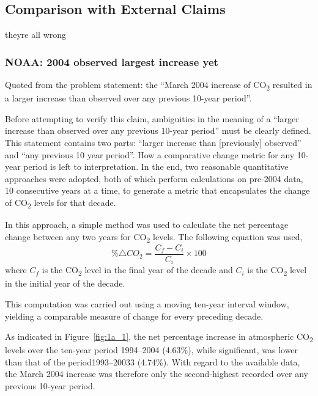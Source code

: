 \documentclass[12pt]{mcmthesis}
\newcommand{\size}[2]{{\fontsize{#1}{0}\selectfont#2}}
\begin{document}
    \subsection{Comparison with External Claims}
    they\textquotesingle re all wrong


    \subsubsection*{NOAA: 2004 observed largest increase yet}

    Quoted from the problem statement: the ``March 2004 increase of CO\textsubscript{2} resulted in a larger increase than observed over any previous 10-year period''.

    Before attempting to verify this claim, ambiguities in the meaning of a ``larger increase than observed over any previous 10-year period'' must be clearly defined.
    This statement contains two parts: ``larger increase than [previously] observed'' and ``any previous 10 year period''.
    How a comparative change metric for any 10-year period is left to interpretation.
    In the end, two reasonable quantitative approaches were adopted, both of which perform calculations on pre-2004 data, 10 consecutive years at a time, to generate a metric that encapsulates the change of CO\textsubscript{2} levels for that decade.


    \noindent\size{12}{\textbf{Comparing to decadal changes}}

    In this approach, a simple method was used to calculate the net percentage change between any two years for CO\textsubscript{2} levels. The following equation was used,
%
    \begin{equation}
        \displaystyle \% \triangle CO_2 = \frac{C_f - C_i}{C_i} \times 100
    \end{equation}
%
    where
    $C_f$ is the CO\textsubscript{2} level in the final year of the decade and
    $C_i$ is the CO\textsubscript{2} level in the initial year of the decade.

    This computation was carried out using a moving ten-year interval window, yielding a comparable measure of change for every preceding decade.

    As indicated in Figure~\ref{fig:1a_1}, the net percentage increase in atmospheric CO\textsubscript{2} levels over the ten-year period 1994--2004 (4.63\%), while significant, was lower than that of the period1993--20033 (4.74\%). With regard to the available data, the March 2004 increase was therefore only the second-highest recorded over any previous 10-year period.
\end{document}
